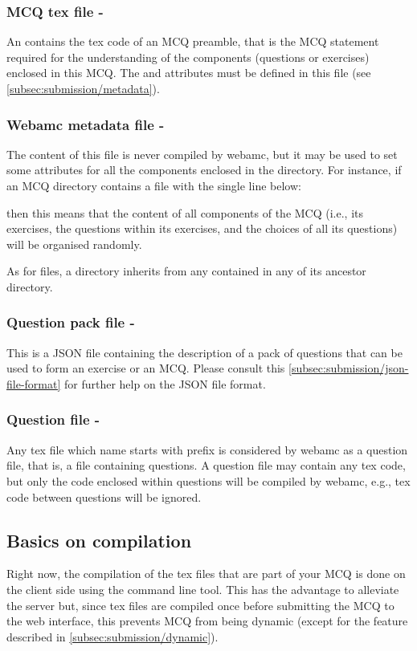 \subsubsection{MCQ tex file - }
An  contains the tex code of an MCQ preamble, that is
the MCQ statement required for the understanding of the components
(questions or exercises) enclosed in this MCQ. The  and
 attributes must be defined in this file (see
\cref{subsec:submission/metadata}).
\subsubsection{Webamc metadata file - }
The content of this file is never compiled by webamc, but it may be
used to set some attributes for all the components enclosed in the
directory. For instance, if an MCQ directory contains a
 file with the single line below:
\begin{tex}
\end{tex}
then this means that the content of all components of the MCQ (i.e.,
its exercises, the questions within its exercises, and the choices of
all its questions) will be organised randomly.

As for  files, a directory inherits from any
 contained in any of its ancestor directory.
\subsubsection{Question pack file - }
This is a JSON file containing the description of a pack of questions
that can be used to form an exercise or an MCQ. Please consult this
\cref{subsec:submission/json-file-format} for further help on
the JSON file format.
\subsubsection{Question file - }
Any tex file which name starts with prefix  is considered
by webamc as a question file, that is, a file containing questions. A
question file may contain any tex code, but only the code enclosed
within questions will be compiled by webamc, e.g., tex code between
questions will be ignored.
\subsection{Basics on compilation}
Right now, the compilation of the tex files that are part of your MCQ
is done on the client side using the  command line
tool. This has the advantage to alleviate the server but, since tex
files are compiled once before submitting the MCQ to the web
interface, this prevents MCQ from being dynamic (except for the
feature described in \cref{subsec:submission/dynamic}).

